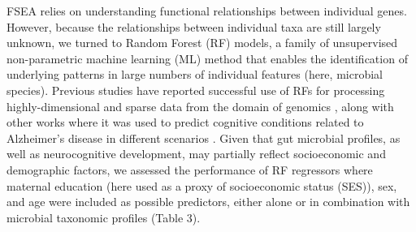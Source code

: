 \documentclass{article}
\begin{document}
FSEA relies on understanding functional relationships between individual
genes. However, because the relationships between individual taxa are
still largely unknown, we turned to Random Forest (RF) models, a family of 
unsupervised non-parametric machine learning (ML) method that enables
the identification of underlying patterns in large numbers of individual features
(here, microbial species).
Previous studies have reported
successful use of RFs for processing highly-dimensional and sparse data
from the domain of genomics
\cite{amaratungaEnrichedRandomForests2008,brieucPracticalIntroductionRandom2018,chenRandomForestsGenomic2012,franzosaGutMicrobiomeStructure2019,stephanRandomForestApproach2015},
along with other works where it was used
to predict cognitive conditions related to Alzheimer's disease in
different scenarios \cite{ardekaniPredictionIncipientAlzheimer2017,velazquezRandomForestModel2021}.
Given that gut microbial profiles, as well as neurocognitive
development, may partially reflect socioeconomic and demographic
factors, we assessed the performance of RF regressors where maternal
education (here used as a proxy of socioeconomic status (SES)),
sex, and age were included as possible predictors, either alone
or in combination with microbial taxonomic profiles (Table 3).
\end{document}
